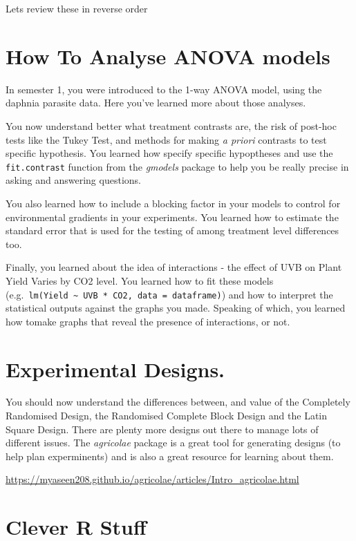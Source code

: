 \documentclass[
]{book}
\begin{document}
Lets review these in reverse order

\hypertarget{how-to-analyse-anova-models}{%
\section{How To Analyse ANOVA models}\label{how-to-analyse-anova-models}}

In semester 1, you were introduced to the 1-way ANOVA model, using the daphnia parasite data. Here you've learned more about those analyses.

You now understand better what treatment contrasts are, the risk of post-hoc tests like the Tukey Test, and methods for making \emph{a priori} contrasts to test specific hypothesis. You learned how specify specific hypoptheses and use the \texttt{fit.contrast} function from the \emph{gmodels} package to help you be really precise in asking and answering questions.

You also learned how to include a blocking factor in your models to control for environmental gradients in your experiments. You learned how to estimate the standard error that is used for the testing of among treatment level differences too.

Finally, you learned about the idea of interactions - the effect of UVB on Plant Yield Varies by CO2 level. You learned how to fit these models (e.g.~\texttt{lm(Yield\ \textasciitilde{}\ UVB\ *\ CO2,\ data\ =\ dataframe)}) and how to interpret the statistical outputs against the graphs you made. Speaking of which, you learned how tomake graphs that reveal the presence of interactions, or not.

\hypertarget{experimental-designs.}{%
\section{Experimental Designs.}\label{experimental-designs.}}

You should now understand the differences between, and value of the Completely Randomised Design, the Randomised Complete Block Design and the Latin Square Design. There are plenty more designs out there to manage lots of different issues. The \emph{agricolae} package is a great tool for generating designs (to help plan experminents) and is also a great resource for learning about them.

\url{https://myaseen208.github.io/agricolae/articles/Intro_agricolae.html}

\hypertarget{clever-r-stuff}{%
\section{Clever R Stuff}\label{clever-r-stuff}}
\end{document}
